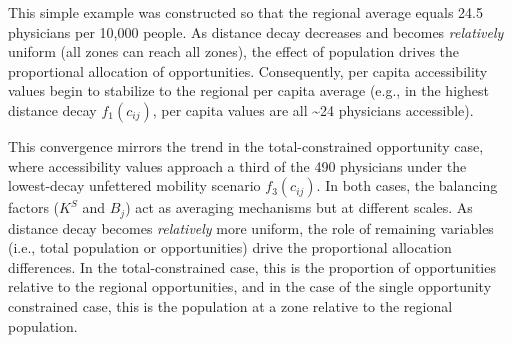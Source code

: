 \documentclass[
  10pt,
  letterpaper,
]{article}
\begin{document}
\begin{table}

\caption{\label{tbl-simple-example-attraction-constrained-accessibility-per-capita}Simple
system: Singly-constrained accessible opportunities per capita.}


\end{table}%

This simple example was constructed so that the regional average equals
24.5 physicians per 10,000 people. As distance decay decreases and
becomes \emph{relatively} uniform (all zones can reach all zones), the
effect of population drives the proportional allocation of
opportunities. Consequently, per capita accessibility values begin to
stabilize to the regional per capita average (e.g., in the highest
distance decay \(f_1(c_{ij})\), per capita values are all
\textasciitilde24 physicians accessible).

This convergence mirrors the trend in the total-constrained opportunity
case, where accessibility values approach a third of the 490 physicians
under the lowest-decay unfettered mobility scenario \(f_3(c_{ij})\). In
both cases, the balancing factors (\(K^S\) and \(B_j\)) act as averaging
mechanisms but at different scales. As distance decay becomes
\emph{relatively} more uniform, the role of remaining variables (i.e.,
total population or opportunities) drive the proportional allocation
differences. In the total-constrained case, this is the proportion of
opportunities relative to the regional opportunities, and in the case of
the single opportunity constrained case, this is the population at a
zone relative to the regional population.
\end{document}

